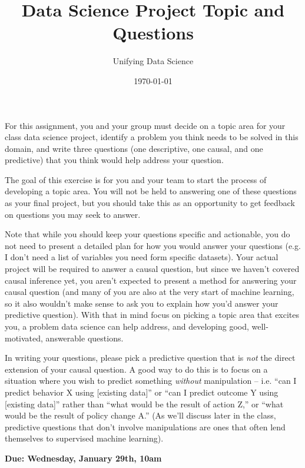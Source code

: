 \documentclass[12pt]{article}
\title{Data Science Project Topic and Questions}
\author{Unifying Data Science}
\date{\today}
\begin{document}
\maketitle

For this assignment, you and your group must decide on a topic area for your class data science project, identify a problem you think needs to be solved in this domain, and write three questions (one descriptive, one causal, and one predictive) that you think would help address your question.

The goal of this exercise is for you and your team to start the process of developing a topic area. You will not be held to answering one of these questions as your final project, but you should take this as an opportunity to get feedback on questions you may seek to answer.

Note that while you should keep your questions specific and actionable, you do not need to present a detailed plan for how you would answer your questions (e.g. I don't need a list of variables you need form specific datasets). Your actual project will be required to answer a causal question, but since we haven't covered causal inference yet, you aren't expected to present a method for answering your causal question (and many of you are also at the very start of machine learning, so it also wouldn't make sense to ask you to explain how you'd answer your predictive question). With that in mind focus on picking a topic area that excites you, a problem data science can help address, and developing good, well-motivated, answerable questions.

In writing your questions, please pick a predictive question that is \emph{not} the direct extension of your causal question. A good way to do this is to focus on a situation where you wish to predict something \emph{without} manipulation -- i.e. ``can I predict behavior X using [existing data]'' or ``can I predict outcome Y using [existing data]'' rather than ``what would be the result of action Z,'' or ``what would be the result of policy change A.'' (As we'll discuss later in the class, predictive questions that don't involve manipulations are ones that often lend themselves to supervised machine learning).

\textbf{Due: Wednesday, January 29th, 10am}
\end{document}
